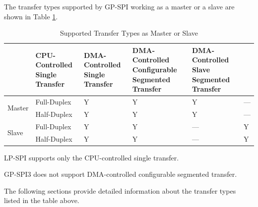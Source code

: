 \documentclass[main\_\_EN.tex]{subfiles}
\begin{document}
The transfer types supported by GP-SPI working as a master or a slave are shown in Table \ref{tab:transfer-modes}.

\begin{table}[H]
    \centering
    \caption{Supported Transfer Types as Master or Slave}
    \label{tab:transfer-modes}
    \begin{threeparttable}
    \begin{tabular}{|l|l|p{2.5cm}<{\centering}|p{2.5cm}<{\centering}|p{3.3cm}<{\centering}|p{3.3cm}<{\centering}| }
    \hline
        \rowcolor{lightgray}
        \multicolumn{2}{l|}{\textbf{Mode}}  & \textbf{CPU-Controlled Single Transfer \tnote{1}}  & \textbf{DMA-Controlled Single Transfer} &   \textbf{DMA-Controlled Configurable Segmented Transfer \tnote{2}}    & \textbf{DMA-Controlled Slave Segmented Transfer} \\\hline
    \multirow{2}{*}{Master} & Full-Duplex & Y & Y & Y & ---\\\cline{2-6}

    & Half-Duplex & Y & Y & Y & ---\\\hline

    \multirow{2}{*}{Slave} & Full-Duplex & Y & Y & --- &Y \\\cline{2-6}
    & Half-Duplex & Y & Y & --- &Y \\\hline
        \end{tabular}
            \begin{tablenotes}
            \item[1] LP-SPI supports only the CPU-controlled single transfer.
            \item[2] GP-SPI3 does not support DMA-controlled configurable segmented transfer.
        \end{tablenotes}
     \end{threeparttable}
    \end{table}

The following sections provide detailed information about the transfer types listed in the table above.
\end{document}
